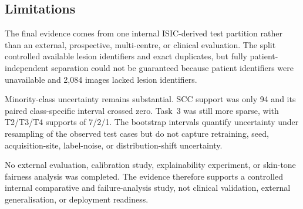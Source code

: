 \subsection{Limitations}

The final evidence comes from one internal ISIC-derived test partition rather
than an external, prospective, multi-centre, or clinical evaluation. The split
controlled available lesion identifiers and exact duplicates, but fully
patient-independent separation could not be guaranteed because patient
identifiers were unavailable and 2,084 images lacked lesion identifiers.

Minority-class uncertainty remains substantial. SCC support was only 94 and
its paired class-specific interval crossed zero. Task~3 was still more sparse,
with T2/T3/T4 supports of 7/2/1. The bootstrap intervals quantify uncertainty
under resampling of the observed test cases but do not capture retraining,
seed, acquisition-site, label-noise, or distribution-shift uncertainty.

No external evaluation, calibration study, explainability experiment, or
skin-tone fairness analysis was completed. The evidence therefore supports a
controlled internal comparative and failure-analysis study, not clinical
validation, external generalisation, or deployment readiness.
